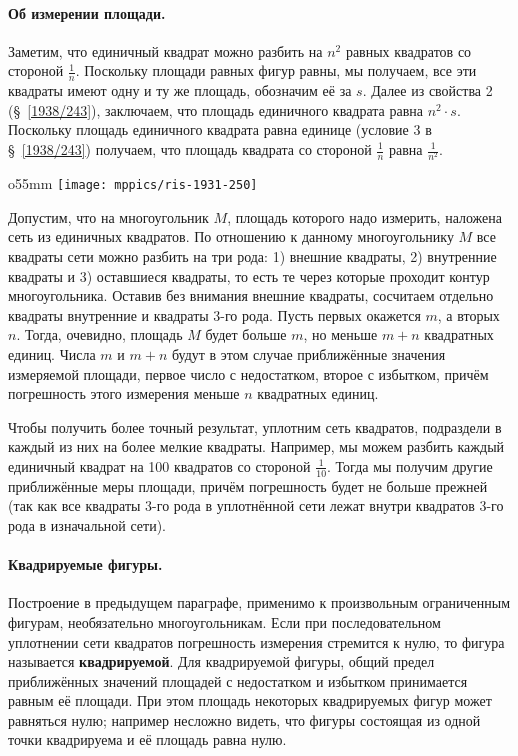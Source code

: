 {\small

\paragraph{Об измерении площади.}\label{1938/244}
Заметим, что единичный квадрат можно разбить на $n^2$ равных квадратов со стороной $\tfrac1n$. 
Поскольку площади равных фигур равны, мы получаем, все эти квадраты имеют одну и ту же площадь, обозначим её за $s$.
Далее из свойства 2 (§~\ref{1938/243}), заключаем, что площадь единичного квадрата равна $n^2\cdot s$.
Поскольку площадь единичного квадрата равна единице (условие 3 в §~\ref{1938/243}) получаем, что площадь квадрата со стороной $\tfrac1n$ равна $\tfrac1{n^2}$.

\begin{wrapfigure}{o}{55mm}
\centering
\texttt{[image: mppics/ris-1931-250]}
\caption{}\label{1931/ris-250}
\end{wrapfigure}

Допустим, что на многоугольник $M$, площадь которого надо измерить, наложена сеть из единичных квадратов.
По отношению к данному многоугольнику $M$ все квадраты сети можно разбить на
три рода: 
1) внешние квадраты, 
2) внутренние квадраты и 
3) оставшиеся квадраты, то есть те через которые проходит контур многоугольника.
Оставив без внимания внешние квадраты, сосчитаем отдельно квадраты внутренние и квадраты 3-го рода.
Пусть первых окажется $m$, а вторых~$n$.
Тогда, очевидно, площадь $M$ будет больше $m$, но меньше $m+n$ квадратных единиц.
Числа $m$ и $m+n$ будут в этом случае приближённые значения измеряемой площади, первое число с недостатком, второе с избытком, причём погрешность этого измерения меньше $n$ квадратных единиц.

Чтобы получить более точный результат, уплотним сеть квадратов, подраздели в каждый из них на более
мелкие квадраты.
Например, мы можем разбить каждый единичный квадрат на 100 квадратов со стороной $\tfrac1{10}$.
Тогда мы получим другие приближённые меры площади, причём погрешность будет не больше прежней (так как все квадраты 3-го рода в уплотнённой сети лежат внутри квадратов 3-го рода в изначальной сети).

\paragraph{Квадрируемые фигуры.}\label{extra/kvad-fig}
Построение в предыдущем параграфе, применимо к произвольным ограниченным фигурам, необязательно многоугольникам.
Если при последовательном уплотнении сети квадратов погрешность измерения стремится к нулю,
то фигура называется \textbf{квадрируемой}.
Для квадрируемой фигуры, общий предел приближённых значений площадей с недостатком и избытком принимается равным её площади.
При этом площадь некоторых квадрируемых фигур может равняться нулю;
например несложно видеть, что фигуры состоящая из одной точки квадрируема и её площадь  равна нулю.

}

